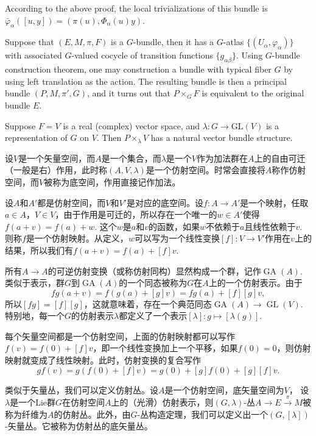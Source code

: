 According to the above proof, the local trivializations of this bundle is $\bar{\varphi}_\alpha([u,y])=(\pi(u),\Phi_\alpha(u)y)$.

\begin{para}\label{13}
	Suppose that $(E,M,\pi,F)$ is a $G$-bundle, then it has a $G$-atlas $\{(U_\alpha,\varphi_\alpha)\}$ with associated $G$-valued cocycle of transition functions $\{g_{\alpha\beta}\}$. Using $G$-bundle construction theorem, one may construction a bundle with typical fiber $G$ by using left translation as the action. The resulting bundle is then a principal bundle $(P,M,\pi',G)$, and it turns out that $P\times_G F$ is equivalent to the original bundle $E$.
\end{para}

\begin{para}
	Suppose $F=V$ is a real (complex) vector space, and $\lambda:G\to \mathrm{GL}(V)$ is a representation of $G$ on $V$. Then $P\times_\lambda V$ has a natural vector bundle structure.
\end{para}

\begin{para}[仿射空间]
	设$V$是一个矢量空间，而$A$是一个集合，而$\lambda$是一个$V$作为加法群在$A$上的自由可迁（一般是右）作用，此时称$(A,V,\lambda)$是一个仿射空间。时常会直接将$A$称作仿射空间，而$V$被称为底空间，作用直接记作加法。

	设$A$和$A'$都是仿射空间，而$V$和$V'$是对应的底空间。设$f:A\to A'$是一个映射，任取$a\in A$，$V\in V$，由于作用是可迁的，所以存在一个唯一的$w\in A'$使得$f(a+v)=f(a)+w$. 这个$w$是$a$和$v$的函数，如果$w$不依赖于$a$且线性依赖于$v$. 则称$f$是一个仿射映射。从定义，$w$可以写为一个线性变换$[f]:V\to V'$作用在$v$上的结果，所以我们有$f(a+v)=f(a)+[f]v$.

	所有$A\to A$的可逆仿射变换（或称仿射同构）显然构成一个群，记作$\operatorname{GA}(A)$. 类似于表示，群$G$到$\operatorname{GA}(A)$的一个同态被称为$G$在$A$上的一个仿射表示。由于
	\[
		fg(a+v)=f(g(a)+[g]v)=fg(a)+[f][g]v,
	\]
	所以$[fg]=[f][g]$，这就意味着，存在一个典范同态$\operatorname{GA}(A)\to \operatorname{GL}(V)$. 特别地，每一个$G$的仿射表示$\lambda$都定义了一个表示$[\lambda]:g\mapsto [\lambda(g)]$.
\end{para}

每个矢量空间都是一个仿射空间，上面的仿射映射都可以写作$f(v)=f(0)+[f]v$，即一个线性变换加上一个平移，如果$f(0)=0$，则仿射映射就变成了线性映射。此时，仿射变换的复合写作
\[
	gf(v)=g(f(0)+[f]v)=g(0)+[g]f(0)+[g][f]v.
\]

\begin{para}[仿射丛]
	类似于矢量丛，我们可以定义仿射丛。设$A$是一个仿射空间，底矢量空间为$V$，	设$\lambda$是一个Lie群$G$在仿射空间$A$上的（光滑）仿射表示，则$(G,\lambda)$-丛$A\to E\xrightarrow{\pi} M$被称为纤维为$A$的仿射丛。此外，由$G$-丛构造定理，我们可以定义出一个$(G,[\lambda])$-矢量丛。它被称为仿射丛的底矢量丛。
\end{para}


